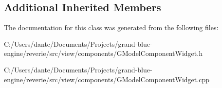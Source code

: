 \subsection*{Additional Inherited Members}


The documentation for this class was generated from the following files\+:\begin{DoxyCompactItemize}
\item 
C\+:/\+Users/dante/\+Documents/\+Projects/grand-\/blue-\/engine/reverie/src/view/components/G\+Model\+Component\+Widget.\+h\item 
C\+:/\+Users/dante/\+Documents/\+Projects/grand-\/blue-\/engine/reverie/src/view/components/G\+Model\+Component\+Widget.\+cpp\end{DoxyCompactItemize}
